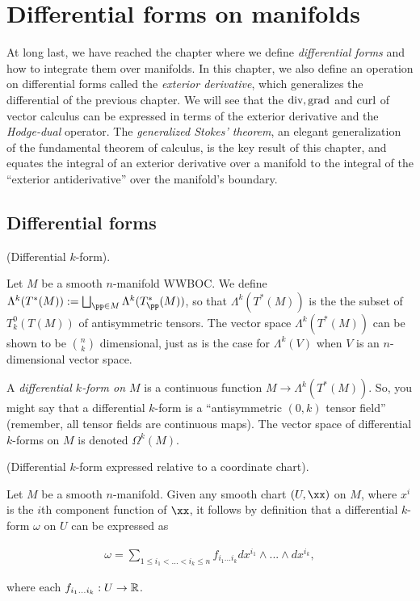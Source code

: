 \chapter{Differential forms on manifolds}
\label{ch::diff_forms}

At long last, we have reached the chapter where we define \textit{differential forms} and how to integrate them over manifolds. In this chapter, we also define an operation on differential forms called the \textit{exterior derivative}, which generalizes the differential of the previous chapter. We will see that the $\text{div}, \text{grad}$ and $\text{curl}$ of vector calculus can be expressed in terms of the exterior derivative and the \textit{Hodge-dual} operator. The \textit{generalized Stokes' theorem}, an elegant generalization of the fundamental theorem of calculus, is the key result of this chapter, and equates the integral of an exterior derivative over a manifold to the integral of the ``exterior antiderivative'' over the manifold's boundary.

\section{Differential forms}

\begin{defn}
     (Differential $k$-form).
    
    Let $M$ be a smooth $n$-manifold WWBOC. We define $\Lambda^k(T^*(M)) := \bigsqcup_{\pp \in M} \Lambda^k(T_\pp^*(M))$, so that $\Lambda^k(T^*(M))$ is the the subset of $T^0_k(T(M))$ of antisymmetric tensors. The vector space $\Lambda^k(T^*(M))$ can be shown to be $\binom{n}{k}$ dimensional, just as is the case for $\Lambda^k(V)$ when $V$ is an $n$-dimensional vector space.
    
    A \textit{differential $k$-form on $M$} is a continuous function $M \rightarrow \Lambda^k(T^*(M))$. So, you might say that a differential $k$-form is a ``antisymmetric $(0, k)$ tensor field'' (remember, all tensor fields are continuous maps). The vector space of differential $k$-forms on $M$ is denoted $\Omega^k(M)$.
\end{defn}

\begin{theorem}
\label{ch::diff_forms::theorem::diff_form_in_chart}
     (Differential $k$-form expressed relative to a coordinate chart).
    
    Let $M$ be a smooth $n$-manifold. Given any smooth chart $(U, \xx)$ on $M$, where $x^i$ is the $i$th component function of $\xx$, it follows by definition that a differential $k$-form $\omega$ on $U$ can be expressed as

    \begin{align*}
        \omega = \sum_{1 \leq i_1 < ... < i_k \leq n} f_{i_1...i_k} dx^{i_1} \wedge ... \wedge dx^{i_k},
    \end{align*}
    
    where each $f_{i_1...i_k}:U \rightarrow \mathbb{R}$.
\end{theorem}

